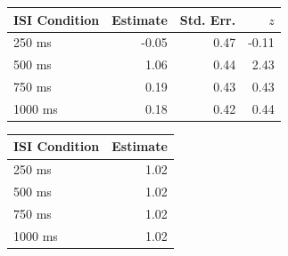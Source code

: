 \documentclass[man,floatsintext]{apa6}
\theoremstyle{definition}
\theoremstyle{definition}
\theoremstyle{definition}
\theoremstyle{remark}
\begin{document}
\begin{appendix}
\begin{table}[!p]
\begin{subtable}{\textwidth}
\begin{table}[H]
\begin{tabular}{lrrr}
\toprule
ISI Condition & Estimate & Std. Err. & $z$\\
\midrule
250  ms & -0.05 & 0.47 & -0.11\\
500  ms & 1.06 & 0.44 & 2.43\\
750  ms & 0.19 & 0.43 & 0.43\\
1000 ms & 0.18 & 0.42 & 0.44\\
\bottomrule
\end{tabular}\endgroup{}
\end{table}
\end{subtable}
\begin{subtable}{\textwidth}
\caption{Variance Component Estimates. Estimates are presented on the standard deviation scale. }
\centering
\begin{table}[H]\centering\begingroup\fontsize{10}{12}\selectfont

\begin{tabular}{lr}
\toprule
ISI Condition & Estimate\\
\midrule
250 ms & 1.02\\
500 ms & 1.02\\
750 ms & 1.02\\
1000 ms & 1.02\\
\bottomrule
\end{tabular}\endgroup{}
\end{table}
\end{subtable}
\end{table}

\begin{table}


\end{table}
\end{appendix}
\end{document}
